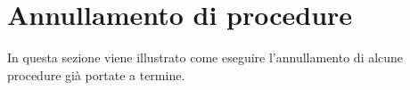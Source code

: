 \section{Annullamento di procedure}
In questa sezione viene illustrato come eseguire l'annullamento di alcune procedure già portate a termine.






